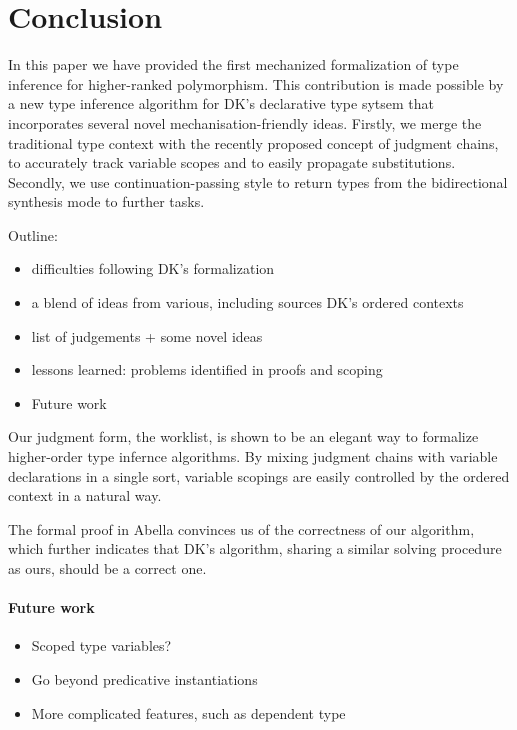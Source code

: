 \section{Conclusion}

In this paper we have provided the first mechanized formalization of type
inference for higher-ranked polymorphism. This contribution is made possible by
a new type inference algorithm for DK's declarative type sytsem that
incorporates several novel mechanisation-friendly ideas. Firstly, we merge the
traditional type context with the recently proposed concept of judgment chains,
to accurately track variable scopes and to easily propagate substitutions.
Secondly, we use continuation-passing style to return types from the
bidirectional synthesis mode to further tasks.



Outline:
\begin{itemize}
    \item difficulties following DK's formalization
    \item a blend of ideas from various, including sources DK's ordered contexts
    \item list of judgements + some novel ideas
    \item lessons learned: problems identified in proofs and scoping
    \item Future work
\end{itemize}

Our judgment form, the worklist, is shown to be an elegant way to
formalize higher-order type infernce algorithms.
By mixing judgment chains with variable declarations in a single sort,
variable scopings are easily controlled by the ordered context in a natural way.

The formal proof in Abella convinces us of the correctness of our algorithm,
which further indicates that DK's algorithm, sharing a similar solving procedure as ours,
should be a correct one.

\paragraph{Future work}
\begin{itemize}
    \item Scoped type variables?
    \item Go beyond predicative instantiations
    \item More complicated features, such as dependent type
\end{itemize}

